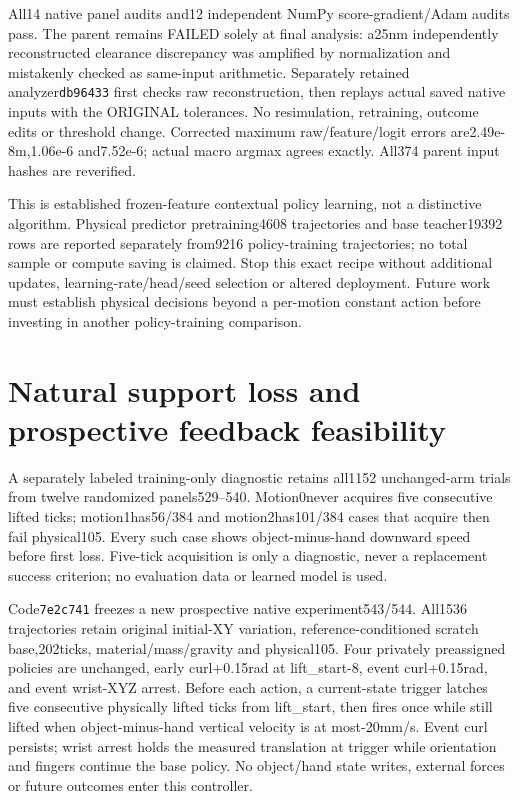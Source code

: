 \documentclass[10pt]{article}
\begin{document}
All14 native panel audits and12 independent NumPy score-gradient/Adam audits
pass. The parent remains FAILED solely at final analysis: a25nm independently
reconstructed clearance discrepancy was amplified by normalization and mistakenly
checked as same-input arithmetic. Separately retained analyzer\texttt{db96433}
first checks raw reconstruction, then replays actual saved native inputs with the
ORIGINAL tolerances. No resimulation, retraining, outcome edits or threshold
change. Corrected maximum raw/feature/logit errors are2.49e-8m,1.06e-6 and7.52e-6;
actual macro argmax agrees exactly. All374 parent input hashes are reverified.

This is established frozen-feature contextual policy learning, not a distinctive
algorithm. Physical predictor pretraining4608 trajectories and base teacher19392
rows are reported separately from9216 policy-training trajectories; no total
sample or compute saving is claimed. Stop this exact recipe without additional
updates, learning-rate/head/seed selection or altered deployment. Future work
must establish physical decisions beyond a per-motion constant action before
investing in another policy-training comparison.


\section{Natural support loss and prospective feedback feasibility}
A separately labeled training-only diagnostic retains all1152 unchanged-arm
trials from twelve randomized panels529--540. Motion0never acquires five
consecutive lifted ticks; motion1has56/384 and motion2has101/384 cases that
acquire then fail physical105. Every such case shows object-minus-hand downward
speed before first loss. Five-tick acquisition is only a diagnostic, never a
replacement success criterion; no evaluation data or learned model is used.

Code\texttt{7e2c741} freezes a new prospective native experiment543/544. All1536
trajectories retain original initial-XY variation, reference-conditioned scratch
base,202ticks, material/mass/gravity and physical105. Four privately preassigned
policies are unchanged, early curl+0.15rad at lift\_start-8, event curl+0.15rad,
and event wrist-XYZ arrest. Before each action, a current-state trigger latches
five consecutive physically lifted ticks from lift\_start, then fires once while
still lifted when object-minus-hand vertical velocity is at most-20mm/s. Event
curl persists; wrist arrest holds the measured translation at trigger while
orientation and fingers continue the base policy. No object/hand state writes,
external forces or future outcomes enter this controller.
\end{document}
